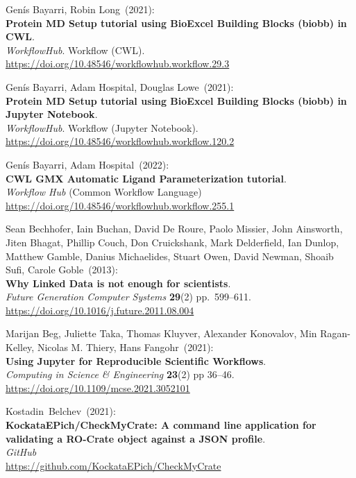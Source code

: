 \begin{thebibliography}{9}
Genís Bayarri, Robin Long~(2021): \\
\textbf{Protein MD Setup tutorial using BioExcel Building Blocks (biobb)
in CWL}.\\
\emph{WorkflowHub}. Workflow (CWL).\\
\url{https://doi.org/10.48546/workflowhub.workflow.29.3}

Genís Bayarri, Adam Hospital, Douglas Lowe~(2021): \\
\textbf{Protein MD Setup tutorial using BioExcel Building Blocks (biobb)
in Jupyter Notebook}.\\
\emph{WorkflowHub}. Workflow (Jupyter Notebook).\\
\url{https://doi.org/10.48546/workflowhub.workflow.120.2}

Genís Bayarri, Adam Hospital~(2022): \\
\textbf{CWL GMX Automatic Ligand Parameterization tutorial}.\\
\emph{Workflow Hub} (Common Workflow Language)\\
\url{https://doi.org/10.48546/workflowhub.workflow.255.1}

Sean Bechhofer, Iain Buchan, David De Roure, Paolo Missier,
John Ainsworth, Jiten Bhagat, Phillip Couch, Don Cruickshank, Mark
Delderfield, Ian Dunlop, Matthew Gamble, Danius Michaelides, Stuart
Owen, David Newman, Shoaib Sufi, Carole Goble~(2013): \\
\textbf{Why Linked Data is not enough for scientists}.\\
\emph{Future Generation Computer Systems} \textbf{29}(2)
pp.~599--611.\\
\url{https://doi.org/10.1016/j.future.2011.08.004}

Marijan Beg, Juliette Taka, Thomas Kluyver, Alexander
Konovalov, Min Ragan-Kelley, Nicolas M. Thiery, Hans Fangohr~(2021): \\
\textbf{Using Jupyter for Reproducible Scientific Workflows}.\\
\emph{Computing in Science \& Engineering} \textbf{23}(2) pp 36--46.\\
\url{https://doi.org/10.1109/mcse.2021.3052101}

Kostadin~Belchev~(2021): \\
\textbf{KockataEPich/CheckMyCrate: A command line application for
validating a RO-Crate object against a JSON profile}.\\
\emph{GitHub}\\
\url{https://github.com/KockataEPich/CheckMyCrate}


\end{thebibliography}
